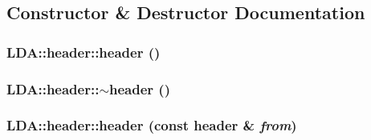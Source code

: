 \subsection{Constructor \& Destructor Documentation}
\hypertarget{class_l_d_a_1_1header_acc6edc4e73755b81ac741fb568104096}{
\subsubsection[{header}]{\setlength{\rightskip}{0pt plus 5cm}LDA::header::header ()}}
\label{class_l_d_a_1_1header_acc6edc4e73755b81ac741fb568104096}
\hypertarget{class_l_d_a_1_1header_af730dfe7c1b7593631cf5a2661286626}{
\subsubsection[{$\sim$header}]{\setlength{\rightskip}{0pt plus 5cm}LDA::header::$\sim$header ()}}
\label{class_l_d_a_1_1header_af730dfe7c1b7593631cf5a2661286626}
\hypertarget{class_l_d_a_1_1header_a9ee9cd4522731899b49805b891b3835f}{
\subsubsection[{header}]{\setlength{\rightskip}{0pt plus 5cm}LDA::header::header (const {\bf header} \& {\em from})}}
\label{class_l_d_a_1_1header_a9ee9cd4522731899b49805b891b3835f}


